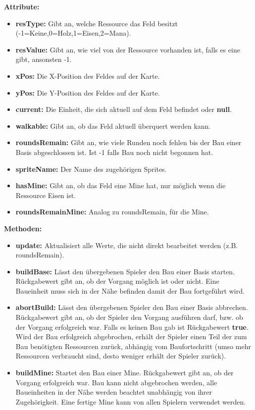 \documentclass[fontsize=12pt,paper=a4,twoside]{scrartcl}
\begin{document}
\textbf{Attribute:}
\begin{itemize}
\item \textbf{resType:} Gibt an, welche Ressource das Feld besitzt (-1=Keine,0=Holz,1=Eisen,2=Mana).
\item \textbf{resValue:} Gibt an, wie viel von der Ressource vorhanden ist, falls es eine gibt, ansonsten -1.
\item \textbf{xPos:} Die X-Position des Feldes auf der Karte.
\item \textbf{yPos:} Die Y-Position des Feldes auf der Karte.
\item \textbf{current:} Die Einheit, die sich aktuell auf dem Feld befindet oder \textbf{null}.
\item \textbf{walkable:} Gibt an, ob das Feld aktuell überquert werden kann.
\item \textbf{roundsRemain:} Gibt an, wie viele Runden noch fehlen bis der Bau einer Basis abgeschlossen ist. Ist -1 falls Bau noch nicht begonnen hat.
\item \textbf{spriteName:} Der Name des zugehörigen Sprites.
\item \textbf{hasMine:} Gibt an, ob das Feld eine Mine hat, nur möglich wenn die Ressource Eisen ist.
\item \textbf{roundsRemainMine:} Analog zu roundsRemain, für die Mine.
\end{itemize}


\textbf{Methoden:}
\begin{itemize}
\item \textbf{update:} Aktualisiert alle Werte, die nicht direkt bearbeitet werden (z.B. roundsRemain).
\item \textbf{buildBase:} Lässt den übergebenen Spieler den Bau einer Basis starten. Rückgabewert gibt an, ob der Vorgang möglich ist oder nicht. Eine Baueinheit muss sich in der Nähe befinden damit der Bau fortgeführt wird.
\item \textbf{abortBuild:} Lässt den übergebenen Spieler den Bau einer Basis abbrechen. Rückgabewert gibt an, ob der Spieler den Vorgang ausführen darf, bzw. ob der Vorgang erfolgreich war. Falls es keinen Bau gab ist Rückgabewert \textbf{true}. Wird der Bau erfolgreich abgebrochen, erhält der Spieler einen Teil der zum Bau benötigten Ressourcen zurück, abhängig vom Baufortschritt (umso mehr Ressourcen verbraucht sind, desto weniger erhält der Spieler zurück).
\item \textbf{buildMine:} Startet den Bau einer Mine. Rückgabewert gibt an, ob der Vorgang erfolgreich war. Bau kann nicht abgebrochen werden, alle Baueinheiten in der Nähe werden beachtet unabhängig von ihrer Zugehörigkeit. Eine fertige Mine kann von allen Spielern verwendet werden.
\end{itemize}
\end{document}
